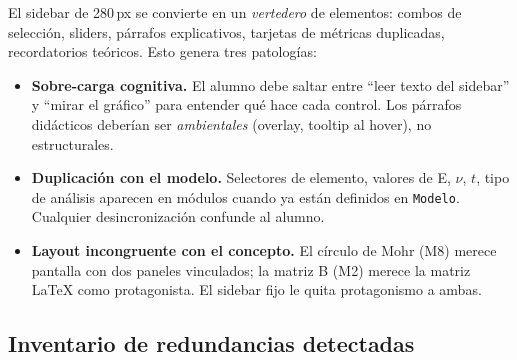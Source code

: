 \documentclass[11pt,a4paper]{article}
\begin{document}
\begin{center}
\end{center}
\vspace{0.6cm}

El sidebar de 280\,px se convierte en un \emph{vertedero} de elementos:
combos de selección, sliders, párrafos explicativos, tarjetas de métricas
duplicadas, recordatorios teóricos. Esto genera tres patologías:

\begin{itemize}[leftmargin=1.2em, itemsep=2pt]
  \item \textbf{Sobre-carga cognitiva.} El alumno debe saltar entre
        ``leer texto del sidebar'' y ``mirar el gráfico'' para entender qué hace
        cada control. Los párrafos didácticos deberían ser \emph{ambientales}
        (overlay, tooltip al hover), no estructurales.
  \item \textbf{Duplicación con el modelo.} Selectores de elemento, valores
        de E, $\nu$, $t$, tipo de análisis aparecen en módulos cuando ya
        están definidos en \texttt{Modelo}. Cualquier desincronización
        confunde al alumno.
  \item \textbf{Layout incongruente con el concepto.} El círculo de Mohr
        (M8) merece pantalla con dos paneles vinculados; la matriz B (M2)
        merece la matriz LaTeX como protagonista. El sidebar fijo le quita
        protagonismo a ambas.
\end{itemize}

\subsection{Inventario de redundancias detectadas}
\end{document}
